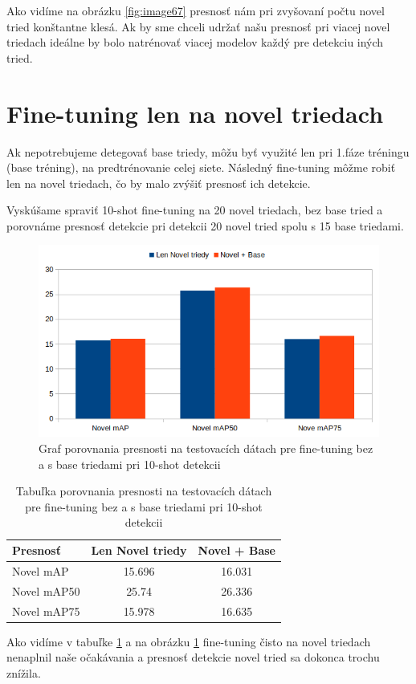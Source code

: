 Ako vidíme na obrázku \ref{fig:image67} presnosť nám pri zvyšovaní počtu novel tried konštantne klesá. Ak by sme chceli udržať našu presnosť pri viacej novel triedach ideálne by bolo natrénovať viacej modelov každý pre detekciu iných tried. 

\section{Fine-tuning len na novel triedach}

Ak nepotrebujeme detegovať base triedy, môžu byť využité len pri 1.fáze tréningu (base tréning), na predtrénovanie celej siete. Následný fine-tuning môžme robiť len na novel triedach, čo by malo zvýšiť presnosť ich detekcie.

Vyskúšame spraviť 10-shot fine-tuning na 20 novel triedach, bez base tried a porovnáme presnosť detekcie pri detekcii 20 novel tried spolu s 15 base triedami. 

\begin{figure}[H]
\centering
\includegraphics[width=\textwidth]{images/only_novel_compare_chart.png}
\caption{Graf porovnania presnosti na testovacích dátach pre fine-tuning bez a s base triedami pri 10-shot detekcii}
\label{fig:image69}
\end{figure}

\begin{table}[H]
\begin{tabular}{|l|c|c|}
\hline
\textbf{Presnosť} & \textbf{Len Novel triedy} & \textbf{Novel + Base} \\
\hline
Novel mAP & 15.696 & 16.031 \\
Novel mAP50 & 25.74 & 26.336 \\
Novel mAP75 & 15.978 & 16.635 \\
\hline
\end{tabular}
\centering
\caption{Tabuľka porovnania presnosti na testovacích dátach pre fine-tuning bez a s base triedami pri 10-shot detekcii}
\label{tab:table63}
\end{table}

Ako vidíme v tabuľke \ref{tab:table63} a na obrázku \ref{fig:image69} fine-tuning čisto na novel triedach nenaplnil naše očakávania a presnosť detekcie novel tried sa dokonca trochu znížila. 
